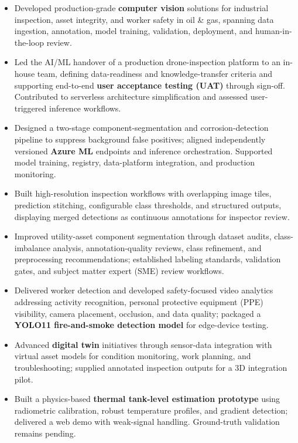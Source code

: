 \documentclass[a4paper,10pt]{article}
\begin{document}
\begin{itemize}
	\item Developed production-grade \textbf{computer vision} solutions for industrial inspection, asset integrity, and worker safety in oil \& gas, spanning data ingestion, annotation, model training, validation, deployment, and human-in-the-loop review.

	\item Led the AI/ML handover of a production drone-inspection platform to an in-house team, defining data-readiness and knowledge-transfer criteria and supporting end-to-end \textbf{user acceptance testing (UAT)} through sign-off. Contributed to serverless architecture simplification and assessed user-triggered inference workflows.

	\item Designed a two-stage component-segmentation and corrosion-detection pipeline to suppress background false positives; aligned independently versioned \textbf{Azure ML} endpoints and inference orchestration. Supported model training, registry, data-platform integration, and production monitoring.

	\item Built high-resolution inspection workflows with overlapping image tiles, prediction stitching, configurable class thresholds, and structured outputs, displaying merged detections as continuous annotations for inspector review.

	\item Improved utility-asset component segmentation through dataset audits, class-imbalance analysis, annotation-quality reviews, class refinement, and preprocessing recommendations; established labeling standards, validation gates, and subject matter expert (SME) review workflows.

	\item Delivered worker detection and developed safety-focused video analytics addressing activity recognition, personal protective equipment (PPE) visibility, camera placement, occlusion, and data quality; packaged a \textbf{YOLO11 fire-and-smoke detection model} for edge-device testing.

	\item Advanced \textbf{digital twin} initiatives through sensor-data integration with virtual asset models for condition monitoring, work planning, and troubleshooting; supplied annotated inspection outputs for a 3D integration pilot.

	\item Built a physics-based \textbf{thermal tank-level estimation prototype} using radiometric calibration, robust temperature profiles, and gradient detection; delivered a web demo with weak-signal handling. Ground-truth validation remains pending.


\end{itemize}
\end{document}
